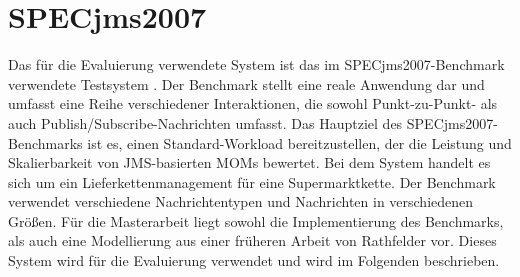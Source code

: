 
\section{SPECjms2007}
\label{sec:specjms}
Das für die Evaluierung verwendete System ist das im SPECjms2007-Benchmark verwendete Testsystem \cite{Sachs2013}. Der Benchmark stellt eine reale Anwendung dar und umfasst eine Reihe verschiedener Interaktionen, die sowohl Punkt-zu-Punkt- als auch Publish/Subscribe-Nachrichten umfasst. Das Hauptziel des SPECjms2007-Benchmarks ist es, einen Standard-Workload bereitzustellen, der die Leistung und Skalierbarkeit von JMS-basierten MOMs bewertet. Bei dem System handelt es sich um ein Lieferkettenmanagement für eine Supermarktkette. Der Benchmark verwendet verschiedene Nachrichtentypen und Nachrichten in verschiedenen Größen. Für die Masterarbeit liegt sowohl die Implementierung des Benchmarks, als auch eine Modellierung aus einer früheren Arbeit von Rathfelder \cite{Rathfelder2013} vor. Dieses System wird für die Evaluierung verwendet und wird im Folgenden beschrieben. 

